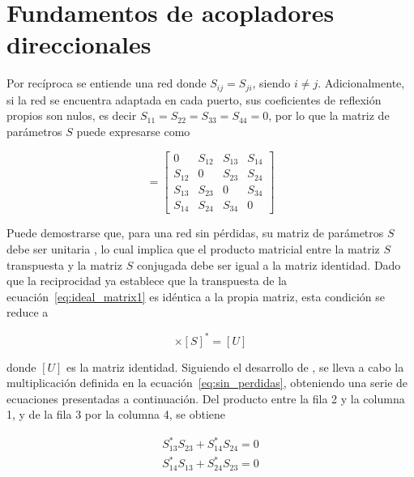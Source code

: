\section{Fundamentos de acopladores direccionales}
Por recíproca se entiende una red donde $S_{ij} = S_{ji}$, siendo $i \neq j$. Adicionalmente, si la red se encuentra adaptada en cada puerto, sus coeficientes de reflexión propios son nulos, es decir $S_{11} = S_{22} = S_{33} = S_{44} = 0$, por lo que la matriz de parámetros $S$ puede expresarse como

\begin{equation}
    [S] = 
    \begin{bmatrix} 
        0      & S_{12}   & S_{13}   & S_{14} \\ 
        S_{12} & 0        & S_{23}   & S_{24} \\ 
        S_{13} & S_{23}   & 0        & S_{34} \\ 
        S_{14} & S_{24}   & S_{34}   & 0 
    \end{bmatrix}
\label{eq:ideal_matrix1}
\end{equation}

Puede demostrarse que, para una red sin pérdidas, su matriz de parámetros $S$ debe ser unitaria \cite[p.~145]{pozar2011}, lo cual implica que el producto matricial entre la matriz $S$ transpuesta y la matriz $S$ conjugada debe ser igual a la matriz identidad. Dado que la reciprocidad ya establece que la transpuesta de la ecuación~\eqref{eq:ideal_matrix1} es idéntica a la propia matriz, esta condición se reduce a

\vspace{-0.5cm}
\begin{equation}
    [S]\times[S]^* = [U] 
\label{eq:sin_perdidas}
\end{equation}

donde $[U]$ es la matriz identidad. Siguiendo el desarrollo de \cite[Cap.~7]{pozar2011}, se lleva a cabo la multiplicación definida en la ecuación~\eqref{eq:sin_perdidas}, obteniendo una serie de ecuaciones presentadas a continuación. Del producto entre la fila 2 y la columna 1, y de la fila 3 por la columna 4, se obtiene

\vspace{-1cm}
\begin{subequations}
    \begin{align}
        S_{13}^*S_{23} + S_{14}^*S_{24} = 0 \\
        S_{14}^*S_{13} + S_{24}^*S_{23} = 0
    \end{align}
    \label{eq:eqs_f2c1}
\end{subequations}
\vspace{-0.5cm}

